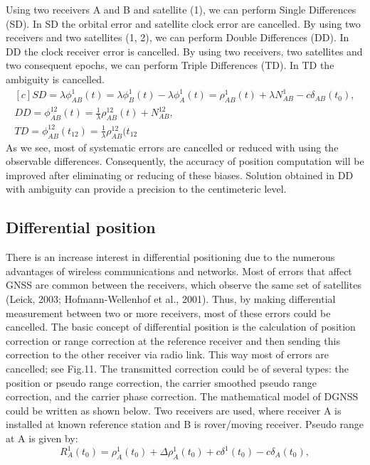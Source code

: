 Using two receivers A and B and satellite (1), we can perform Single Differences (SD). In SD
the orbital error and satellite clock error are cancelled.
By using two receivers and two satellites (1, 2), we can perform Double Differences (DD).
In DD the clock receiver error is cancelled. By using two receivers, two satellites and two 
consequent epochs, we can perform Triple Differences (TD). In TD the ambiguity is cancelled.
\begin{equation}
	\label{equ:cancellation}
	\begin{aligned}[c]
		SD = \lambda \phi_{AB}^{1}(t) = \lambda \phi_{B}^{1}(t)-\lambda \phi_{A}^{1}(t) =
		\rho^{1}_{AB}(t) + \lambda N^{1}_{AB}- c\delta_{AB}(t_{0}),\\
		DD = \phi_{AB}^{12}(t) = \frac{1}{\lambda}\rho^{12}_{AB}(t) + N^{12}_{AB},\\
		TD = \phi_{AB}^{12}(t_{12}) = \frac{1}{\lambda}\rho^{12}_{AB}(t_{12}
	\end{aligned}
\end{equation}
As we see, most of systematic errors are cancelled or reduced with using the observable
differences. Consequently, the accuracy of position computation will be improved after
eliminating or reducing of these biases. Solution obtained in DD with ambiguity can provide a
precision to the centimeteric level.

\subsection{Differential position}
There is an increase interest in differential positioning due to the numerous advantages of
wireless communications and networks. Most of errors that affect GNSS are common between
the receivers, which observe the same set of satellites (Leick, 2003; Hofmann-Wellenhof et al.,
2001). Thus, by making differential measurement between two or more receivers, most of these
errors could be cancelled.
The basic concept of differential position is the calculation of position correction or range
correction at the reference receiver and then sending this correction to the other receiver via
radio link. This way most of errors are cancelled; see Fig.11. The transmitted correction could be
of several types: the position or pseudo range correction, the carrier smoothed pseudo range
correction, and the carrier phase correction. The mathematical model of DGNSS could be written
as shown below. Two receivers are used, where receiver A is installed at known reference station
and B is rover/moving receiver. Pseudo range at A is given by:
\begin{equation}
	\label{equ:diferential_pos1}
	R^{1}_{A}(t_{0}) = \rho^{1}_{A}(t_{0}) + \Delta \rho^{1}_{A}(t_{0}) + c \delta^{1}(t_{0})
	- c \delta_{A}(t_{0}),
\end{equation}

